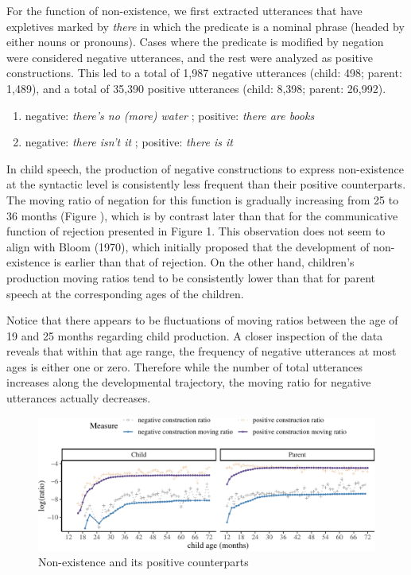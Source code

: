 \documentclass[
  english,
  man,floatsintext]{apa6}
\providecommand{\tightlist}{%
  \setlength{\itemsep}{0pt}\setlength{\parskip}{0pt}}
\begin{document}
For the function of non-existence, we first extracted utterances that have expletives marked by \emph{there} in which the predicate is a nominal phrase (headed by either nouns or pronouns). Cases where the predicate is modified by negation were considered negative utterances, and the rest were analyzed as positive constructions. This led to a total of 1,987 negative utterances (child: 498; parent: 1,489), and a total of 35,390 positive utterances (child: 8,398; parent: 26,992).

\begin{enumerate}
\def\labelenumi{(\arabic{enumi})}
\setcounter{enumi}{4}
\tightlist
\item
  negative: \emph{there's no (more) water} ; positive: \emph{there are books}
\item
  negative: \emph{there isn't it} ; positive: \emph{there is it}
\end{enumerate}

In child speech, the production of negative constructions to express non-existence at the syntactic level is consistently less frequent than their positive counterparts. The moving ratio of negation for this function is gradually increasing from 25 to 36 months (Figure ), which is by contrast later than that for the communicative function of rejection presented in Figure 1. This observation does not seem to align with Bloom (1970), which initially proposed that the development of non-existence is earlier than that of rejection. On the other hand, children's production moving ratios tend to be consistently lower than that for parent speech at the corresponding ages of the children.

Notice that there appears to be fluctuations of moving ratios between the age of 19 and 25 months regarding child production. A closer inspection of the data reveals that within that age range, the frequency of negative utterances at most ages is either one or zero. Therefore while the number of total utterances increases along the developmental trajectory, the moving ratio for negative utterances actually decreases.

\begin{figure}[H]

{\centering \includegraphics{neg_construction_article_files/figure-latex/existence-1} 

}

\caption{Non-existence and its positive counterparts}\label{fig:existence}
\end{figure}
\end{document}
